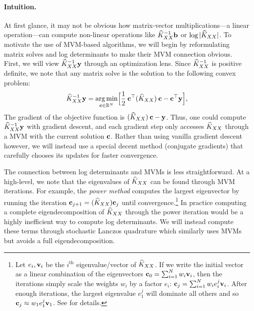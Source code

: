 \paragraph{Intuition.}
At first glance, it may not be obvious how matrix-vector multiplications---a linear operation---can compute non-linear operations like $\widehat{K}_{XX}^{-1} \mathbf{b}$ or $\log \vert \widehat{K}_{XX} \vert$.
To motivate the use of MVM-based algorithms, we will begin by reformulating matrix solves and log determinants to make their MVM connection obvious.
First, we will view $\widehat{K}_{XX}^{-1} \mathbf{y}$ through an optimization lens.
Since $\widehat{K}_{XX}^{-1}$ is positive definite, we note that any matrix solve is the solution to the following convex problem:
%
\begin{equation}
  \widehat{K}_{XX}^{-1} \mathbf{y} = \operatorname*{arg\,min}_{\mathbf{c} \in \mathbb{R}^{N}} \Bigl[ \frac{1}{2} \: \mathbf{c}^\top (\widehat{K}_{XX}) \: \mathbf{c} - \mathbf{c}^\top \mathbf{y} \Bigr],
  \label{eqn:solve_as_optim}
\end{equation}
%
The gradient of the objective function is $(\widehat{K}_{XX}) \: \mathbf{c} - \mathbf{y}$.
Thus, one could compute $\widehat{K}_{XX}^{-1} \mathbf{y}$ with gradient descent, and each gradient step only accesses $\widehat{K}_{XX}$ through a MVM with the current solution $\mathbf{c}$.
Rather than using vanilla gradient descent however, we will instead use a special decent method (conjugate gradients) that carefully chooses its updates for faster convergence.

The connection between log determinants and MVMs is less straightforward.
At a high-level, we note that the eigenvalues of $\widehat{K}_{XX}$ can be found through MVM iterations.
For example, the \emph{power method} computes the largest eigenvector by running the iteration $\mathbf{c}_{j+1} = (\widehat{K}_{XX}) \mathbf{c}_{j}$ until convergence.\footnote{
  Let $e_i, \mathbf{v}_i$ be the $i^\text{th}$ eigenvalue/vector of $\widehat{K}_{XX}$.
  If we write the initial vector as a linear combination of the eigenvectors $\mathbf{c}_{0} = \sum_{i=1}^N w_i \mathbf{v}_i$, then the iterations simply scale the weights $w_i$ by a factor $e_i$:
  $\mathbf{c}_{j} = \sum_{i=1}^N w_i e_i^j \mathbf{v}_i$.
  After enough iterations, the largest eigenvalue $e_1^j$ will dominate all others and so $\mathbf{c}_j \approx w_1 e_1^j \mathbf{v}_1$.
  See \citep[e.g.][Ch. 8]{golub2012matrix} for details.
}
In practice computing a complete eigendecomposition of $\widehat{K}_{XX}$ through the power iteration would be a highly inefficient way to compute log determinants.
We will instead compute these terms through stochastic Lanczos quadrature \citep{ubaru2017fast} which similarly uses MVMs but avoids a full eigendecomposition.

